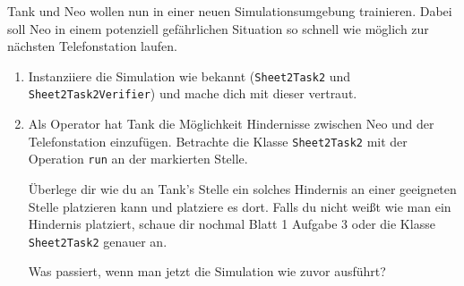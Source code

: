 

Tank und Neo wollen nun in einer neuen Simulationsumgebung trainieren. 
Dabei soll Neo in einem potenziell gefährlichen Situation so schnell wie möglich zur nächsten Telefonstation laufen.

\begin{enumerate}
    \item Instanziiere die Simulation wie bekannt (\lstinline{Sheet2Task2} und \lstinline{Sheet2Task2Verifier}) und mache dich mit dieser vertraut.
    \item Als Operator hat Tank die Möglichkeit Hindernisse zwischen Neo und der Telefonstation einzufügen.
        Betrachte die Klasse \lstinline{Sheet2Task2} mit der Operation \lstinline{run} an der markierten Stelle.

        Überlege dir wie du an Tank's Stelle ein solches Hindernis an einer geeigneten Stelle platzieren kann und platziere es dort. Falls du nicht weißt wie man ein Hindernis platziert, schaue dir nochmal Blatt 1 Aufgabe 3 oder die Klasse \lstinline{Sheet2Task2} genauer an.

        Was passiert, wenn man jetzt die Simulation wie zuvor ausführt?\\
        
\end{enumerate}

